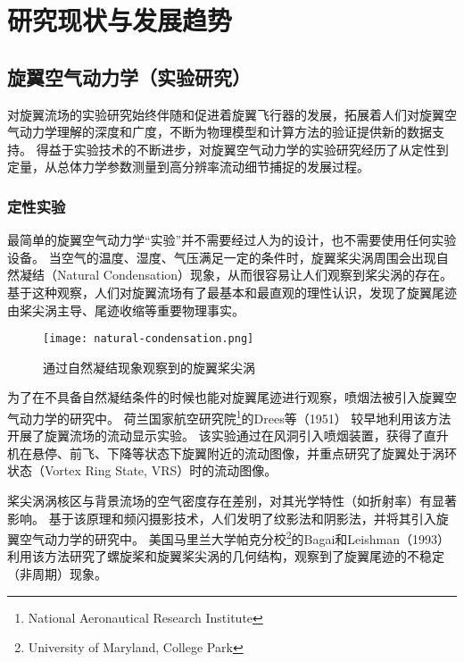 \chapter{研究现状与发展趋势}

\section{旋翼空气动力学（实验研究）}
对旋翼流场的实验研究始终伴随和促进着旋翼飞行器的发展，拓展着人们对旋翼空气动力学理解的深度和广度，不断为物理模型和计算方法的验证提供新的数据支持。
得益于实验技术的不断进步，对旋翼空气动力学的实验研究经历了从定性到定量，从总体力学参数测量到高分辨率流动细节捕捉的发展过程。

\subsection{定性实验}
最简单的旋翼空气动力学“实验”并不需要经过人为的设计，也不需要使用任何实验设备。
当空气的温度、湿度、气压满足一定的条件时，旋翼桨尖涡周围会出现自然凝结（Natural Condensation）现象，从而很容易让人们观察到桨尖涡的存在。
基于这种观察，人们对旋翼流场有了最基本和最直观的理性认识，发现了旋翼尾迹由桨尖涡主导、尾迹收缩等重要物理事实。
\begin{figure}[h!]
  \centering
  \texttt{[image: natural-condensation.png]}\\
  \caption{通过自然凝结现象观察到的旋翼桨尖涡}
\end{figure}

为了在不具备自然凝结条件的时候也能对旋翼尾迹进行观察，喷烟法被引入旋翼空气动力学的研究中。
荷兰国家航空研究院\footnote{National Aeronautical Research Institute}的Drees等（1951）
较早地利用该方法开展了旋翼流场的流动显示实验。
该实验通过在风洞引入喷烟装置，获得了直升机在悬停、前飞、下降等状态下旋翼附近的流动图像，并重点研究了旋翼处于涡环状态（Vortex Ring State, VRS）时的流动图像。
\begin{figure}[t!]
\begin{floatrow}
\end{floatrow}
\end{figure}

桨尖涡涡核区与背景流场的空气密度存在差别，对其光学特性（如折射率）有显著影响。
基于该原理和频闪摄影技术，人们发明了纹影法和阴影法，并将其引入旋翼空气动力学的研究中。
美国马里兰大学帕克分校\footnote{University of Maryland, College Park}的Bagai和Leishman（1993）
利用该方法研究了螺旋桨和旋翼桨尖涡的几何结构，观察到了旋翼尾迹的不稳定（非周期）现象。

